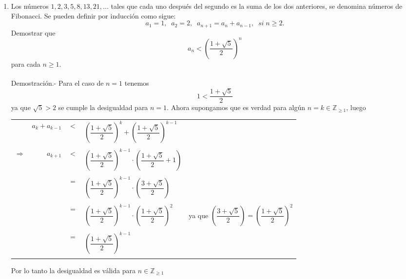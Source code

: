 \begin{enumerate}[ \bfseries 1.]
\item Los números $1,2,3,5,8,13,21,...$ tales que cada uno después del segundo es la suma de los dos anteriores, se denomina números de Fibonacci. Se pueden definir por inducción como sigue:
$$a_1=1, \; \; a_2=2, \; \; a_{n+1} = a_n + a_{n-1}, \; \; si \; n \geq 2.$$
Demostrar que $$a_n < \left( \dfrac{1 + \sqrt{5}}{2} \right)^n$$
para cada $n \geq 1.$\\\\
Demostración.- \; Para el caso de $n=1$ tenemos $$1 < \dfrac{1+\sqrt{5}}{2}$$ ya que $\sqrt{5}>2$ se cumple la desigualdad para $n=1$. Ahora supongamos que es verdad para algún $n= k \in \mathbb{Z}_{\geq 1}$, luego 
\begin{center}
\begin{tabular}{crcll}
&$a_k + a_{k-1}$&$<$&$ \left( \dfrac{1+\sqrt{5}}{2} \right)^k +  \left( \dfrac{1+\sqrt{5}}{2} \right)^{k-1}$&\\\\
$\Rightarrow$&$a_{k+1}$&$<$&$\left( \dfrac{1 + \sqrt{5}}{2} \right)^{k-1} \cdot \left( \dfrac{1 + \sqrt{5}}{2} + 1 \right)$&\\\\ 
&&$=$&$\left( \dfrac{1 + \sqrt{5}}{2} \right)^{k-1} \cdot \left( \dfrac{3 + \sqrt{5}}{2} \right)$&\\\\
&&$=$&$\left( \dfrac{1 + \sqrt{5}}{2} \right)^{k-1} \cdot \left( \dfrac{1 + \sqrt{5}}{2} \right)^2$&ya que $\left( \dfrac{3 + \sqrt{5}}{2} \right) = \left( \dfrac{1+\sqrt{5}}{2}\right)^2$\\\\
&&$=$&$\left( \dfrac{1 + \sqrt{5}}{2} \right)^{k-1}$&\\\\
\end{tabular}
 
\end{center}
Por lo tanto la desigualdad es válida para $n \in \mathbb{Z}_{\geq 1}$\\\\


\end{enumerate}
